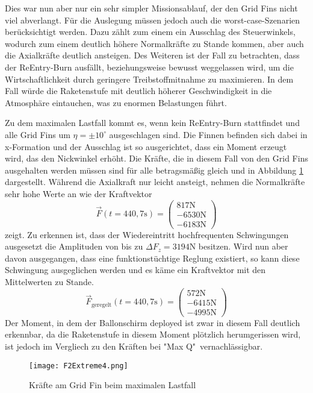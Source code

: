 Dies war nun aber nur ein sehr simpler Missionsablauf, der den Grid Fins nicht viel abverlangt. Für die Auslegung müssen jedoch auch die worst-case-Szenarien berücksichtigt werden. Dazu zählt zum einem ein Ausschlag des Steuerwinkels, wodurch zum einem deutlich höhere Normalkräfte zu Stande kommen, aber auch die Axialkräfte deutlich ansteigen. Des Weiteren ist der Fall zu betrachten, dass der ReEntry-Burn ausfällt, beziehungsweise bewusst weggelassen wird, um die Wirtschaftlichkeit durch geringere Treibstoffmitnahme zu maximieren. In dem Fall würde die Raketenstufe mit deutlich höherer Geschwindigkeit in die Atmosphäre eintauchen, was zu enormen Belastungen führt.

Zu dem maximalen Lastfall kommt es, wenn kein ReEntry-Burn stattfindet und alle Grid Fins um $\eta = \pm 10^\circ$ ausgeschlagen sind. Die Finnen befinden sich dabei in x-Formation und der Ausschlag ist so ausgerichtet, dass ein Moment erzeugt wird, das den Nickwinkel erhöht. Die Kräfte, die in diesem Fall von den Grid Fins ausgehalten werden müssen sind für alle betragsmäßig gleich und in Abbildung \ref{abb_FExtreme} dargestellt. Während die Axialkraft nur leicht ansteigt, nehmen die Normalkräfte sehr hohe Werte an wie der Kraftvektor
\begin{equation}
	\vec{F}(t=440,7\mathrm{s})
	=\left(\begin{array}{c}817\mathrm{N}\\-6530\mathrm{N}\\-6183\mathrm{N}\end{array}\right)
\end{equation}
zeigt. Zu erkennen ist, dass der Wiedereintritt hochfrequenten Schwingungen ausgesetzt die Amplituden von bis zu $\Delta F_z = 3194$N besitzen. Wird nun aber davon ausgegangen, dass eine funktionstüchtige Reglung existiert, so kann diese Schwingung ausgeglichen werden und es käme ein Kraftvektor mit den Mittelwerten zu Stande.
\begin{equation}
\vec{F}_\mathrm{geregelt}(t=440,7\mathrm{s})
=\left(\begin{array}{c}572\mathrm{N}\\-6415\mathrm{N}\\-4995\mathrm{N}\end{array}\right)
\end{equation}
Der Moment, in dem der Ballonschirm deployed ist zwar in diesem Fall deutlich erkennbar, da die Raketenstufe in diesem Moment plötzlich herumgerissen wird, ist jedoch im Vergliech zu den Kräften bei "Max Q"\ vernachlässigbar.
\begin{figure}[h] 
	\centering
	\texttt{[image: F2Extreme4.png]}
	\caption{Kräfte am Grid Fin beim maximalen Lastfall}
	\label{abb_FExtreme}
\end{figure}\\
